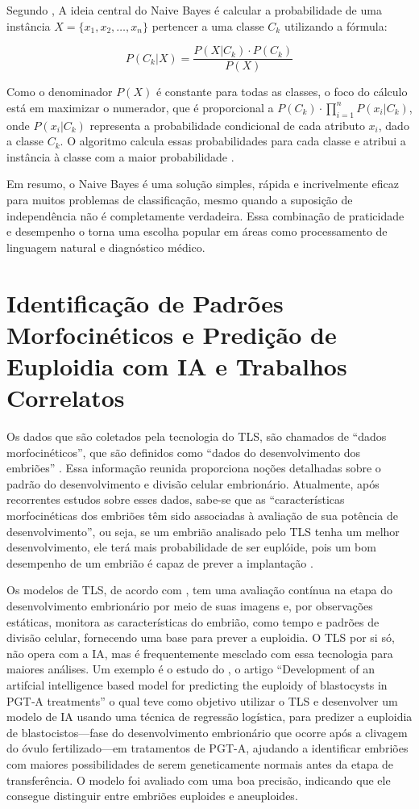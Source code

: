 Segundo , A ideia central do Naive Bayes é calcular a probabilidade de uma instância $X = \{x_1, x_2, \dots, x_n\}$ pertencer a uma classe $C_k$ utilizando a fórmula:

$$P(C_k|X) = \frac{P(X|C_k) \cdot P(C_k)}{P(X)}$$

Como o denominador $P(X)$ é constante para todas as classes, o foco do cálculo está em maximizar o numerador, que é proporcional a $P(C_k) \cdot \prod_{i=1}^{n} P(x_i | C_k)$, onde $P(x_i | C_k)$ representa a probabilidade condicional de cada atributo $x_i$, dado a classe $C_k$. O algoritmo calcula essas probabilidades para cada classe e atribui a instância à classe com a maior probabilidade \cite{zhang2004}. 

Em resumo, o Naive Bayes é uma solução simples, rápida e incrivelmente eficaz para muitos problemas de classificação, mesmo quando a suposição de independência não é completamente verdadeira. Essa combinação de praticidade e desempenho o torna uma escolha popular em áreas como processamento de linguagem natural e diagnóstico médico.

\section{Identificação de Padrões Morfocinéticos e Predição de Euploidia com IA e Trabalhos Correlatos}

Os dados que são coletados pela tecnologia do TLS, são chamados de “dados morfocinéticos”, que são definidos como “dados do desenvolvimento dos embriões” \cite{oliveira2024}. Essa informação reunida proporciona noções detalhadas sobre o padrão do desenvolvimento e divisão celular embrionário. Atualmente, após recorrentes estudos sobre esses dados, sabe-se que as “características morfocinéticas dos embriões têm sido associadas à avaliação de sua potência de desenvolvimento”, ou seja, se um embrião analisado pelo TLS tenha um melhor desenvolvimento, ele terá mais probabilidade de ser euplóide, pois um bom desempenho de um embrião é capaz de prever a implantação \cite{yuan2023}.

Os modelos de TLS, de acordo com , tem uma avaliação contínua na etapa do desenvolvimento embrionário por meio de suas imagens e, por observações estáticas, monitora as características do embrião, como tempo e padrões de divisão celular, fornecendo uma base para prever a euploidia. O TLS por si só, não opera com a IA, mas é frequentemente mesclado com essa tecnologia para maiores análises. Um exemplo é o estudo do , o artigo “Development of an artifcial intelligence based model for predicting the euploidy of blastocysts in PGT‐A treatments” o qual teve como objetivo utilizar o TLS e desenvolver um modelo de IA usando uma técnica de regressão logística, para predizer a euploidia de blastocistos—fase do desenvolvimento embrionário que ocorre após a clivagem do óvulo fertilizado—em tratamentos de PGT-A, ajudando a identificar embriões com maiores possibilidades de serem geneticamente normais antes da etapa de transferência. O modelo foi avaliado com uma boa precisão, indicando que ele consegue distinguir entre embriões euploides e aneuploides.

